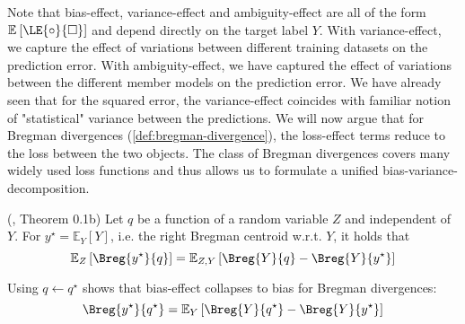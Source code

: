 \documentclass[../main.tex]{subfiles}
\begin{document}
Note that bias-effect, variance-effect and ambiguity-effect are all of the form $\mathbb{E}_{}\left[ \LE{\circ}{\square} \right]$ and depend directly on the target label $Y$. 
With variance-effect, we capture the {effect} of variations between different training datasets on the prediction error.
With ambiguity-effect, we have captured the effect of variations between the different member models on the prediction error.
We have already seen that for the squared error, the variance-effect coincides with familiar notion of "statistical" variance between the predictions.
We will now argue that for Bregman divergences (\cf \ref{def:bregman-divergence}), the loss-effect terms reduce to the loss between the two objects.
The class of Bregman divergences covers many widely used loss functions and thus allows us to formulate a unified bias-variance-decomposition. 



\begin{lemma} \label{thm:bregman-collapse-bias} (\cite{pfau_GeneralizedBiasVarianceDecomposition_}, Theorem 0.1b)
    Let $q$ be a function of a random variable $Z$ and independent of $Y$. For $y^\star = \mathbb{E}_{Y}\left[ Y \right]$, i.e. the right Bregman centroid w.r.t. $Y$, it holds that
$$
\mathbb{E}_{Z}\left[ \Breg{y^\star}{q} \right]  = \mathbb{E}_{Z,Y}\left[ \Breg{Y}{q} - \Breg{Y}{y^\star} \right] 
$$
\end{lemma}

Using $q \gets q^\star$ shows that bias-effect collapses to bias for Bregman divergences: 
$$\Breg{y^\star}{q^\star} = \mathbb{E}_{Y}\left[ \Breg{Y}{q^\star} - \Breg{Y}{y^\star} \right]$$
\end{document}
